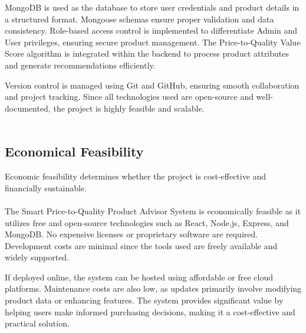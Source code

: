 MongoDB is used as the database to store user credentials and product details in a structured format. Mongoose schemas ensure proper validation and data consistency. Role-based access control is implemented to differentiate Admin and User privileges, ensuring secure product management. The Price-to-Quality Value Score algorithm is integrated within the backend to process product attributes and generate recommendations efficiently.

Version control is managed using Git and GitHub, ensuring smooth collaboration and project tracking. Since all technologies used are open-source and well-documented, the project is highly feasible and scalable.\\\\
 \noindent


 
 \subsection{Economical Feasibility}
 Economic feasibility determines whether the project is cost-effective and financially sustainable.\\\\
 The Smart Price-to-Quality Product Advisor System is economically feasible as it utilizes free and open-source technologies such as React, Node.js, Express, and MongoDB. No expensive licenses or proprietary software are required. Development costs are minimal since the tools used are freely available and widely supported.

If deployed online, the system can be hosted using affordable or free cloud platforms. Maintenance costs are also low, as updates primarily involve modifying product data or enhancing features. The system provides significant value by helping users make informed purchasing decisions, making it a cost-effective and practical solution.


 
